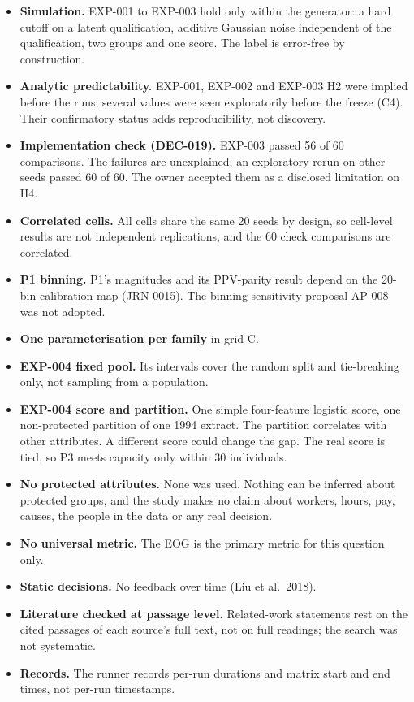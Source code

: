 \documentclass[
]{article}
\providecommand{\tightlist}{%
  \setlength{\itemsep}{0pt}\setlength{\parskip}{0pt}}
\begin{document}
\begin{itemize}
\tightlist
\item
  \textbf{Simulation.} EXP-001 to EXP-003 hold only within the
  generator: a hard cutoff on a latent qualification, additive Gaussian
  noise independent of the qualification, two groups and one score. The
  label is error-free by construction.
\item
  \textbf{Analytic predictability.} EXP-001, EXP-002 and EXP-003 H2 were
  implied before the runs; several values were seen exploratorily before
  the freeze (C4). Their confirmatory status adds reproducibility, not
  discovery.
\item
  \textbf{Implementation check (DEC-019).} EXP-003 passed 56 of 60
  comparisons. The failures are unexplained; an exploratory rerun on
  other seeds passed 60 of 60. The owner accepted them as a disclosed
  limitation on H4.
\item
  \textbf{Correlated cells.} All cells share the same 20 seeds by
  design, so cell-level results are not independent replications, and
  the 60 check comparisons are correlated.
\item
  \textbf{P1 binning.} P1's magnitudes and its PPV-parity result depend
  on the 20-bin calibration map (JRN-0015). The binning sensitivity
  proposal AP-008 was not adopted.
\item
  \textbf{One parameterisation per family} in grid C.
\item
  \textbf{EXP-004 fixed pool.} Its intervals cover the random split and
  tie-breaking only, not sampling from a population.
\item
  \textbf{EXP-004 score and partition.} One simple four-feature logistic
  score, one non-protected partition of one 1994 extract. The partition
  correlates with other attributes. A different score could change the
  gap. The real score is tied, so P3 meets capacity only within 30
  individuals.
\item
  \textbf{No protected attributes.} None was used. Nothing can be
  inferred about protected groups, and the study makes no claim about
  workers, hours, pay, causes, the people in the data or any real
  decision.
\item
  \textbf{No universal metric.} The EOG is the primary metric for this
  question only.
\item
  \textbf{Static decisions.} No feedback over time (Liu et al.~2018).
\item
  \textbf{Literature checked at passage level.} Related-work statements
  rest on the cited passages of each source's full text, not on full
  readings; the search was not systematic.
\item
  \textbf{Records.} The runner records per-run durations and matrix
  start and end times, not per-run timestamps.
\end{itemize}
\end{document}
